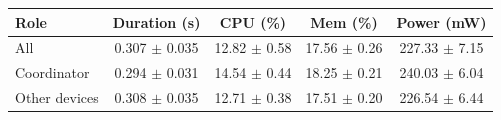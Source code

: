 \begin{tabular}{lcccc}
\hline
\textbf{Role} & \textbf{Duration (s)} & \textbf{CPU (\%)} & \textbf{Mem (\%)} & \textbf{Power (mW)} \\
\hline
All & 0.307 $\pm$ 0.035 & 12.82 $\pm$ 0.58 & 17.56 $\pm$ 0.26 & 227.33 $\pm$ 7.15 \\
Coordinator & 0.294 $\pm$ 0.031 & 14.54 $\pm$ 0.44 & 18.25 $\pm$ 0.21 & 240.03 $\pm$ 6.04 \\
Other devices & 0.308 $\pm$ 0.035 & 12.71 $\pm$ 0.38 & 17.51 $\pm$ 0.20 & 226.54 $\pm$ 6.44 \\
\hline
\end{tabular}

